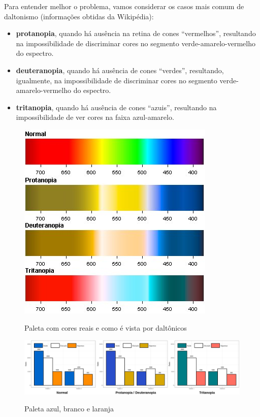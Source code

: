 \documentclass[12pt]{article}   %
\begin{document}
Para entender melhor o problema, vamos considerar os casos mais comum de
daltonismo (informações obtidas da Wikipédia):

\begin{itemize}
    \item \textbf{protanopia}, quando há ausência na retina de cones
    ``vermelhos'', resultando na impossibilidade de discriminar cores no
    segmento verde-amarelo-vermelho do espectro.
    
    \item \textbf{deuteranopia}, quando há ausência de cones ``verdes'',
    resultando, igualmente, na impossibilidade de discriminar cores no segmento
    verde-amarelo-vermelho do espectro.
    
    \item \textbf{tritanopia}, quando há ausência de cones ``azuis'', resultando
    na impossibilidade de ver cores na faixa azul-amarelo.
\end{itemize}

\begin{figure}
    \centering
    \caption{Paleta com cores reais e como é vista por daltônicos}
    \includegraphics[scale=1.3]{paleta}
    \label{fig_paleta_daltonicos}
    \vspace{1cm}
\end{figure}

\begin{figure}
    \centering
    \caption{Paleta azul, branco e laranja}
    \includegraphics[scale=0.3]{AzulLaranja}
    \label{fig_paleta_azul_branco_laranja}
\end{figure}
\end{document}
